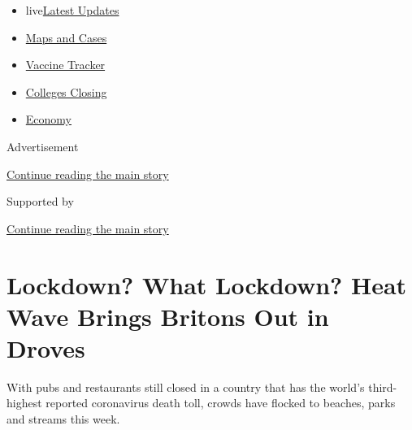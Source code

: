 \begin{itemize}
\tightlist
\item
  live\href{https://www.nytimes3xbfgragh.onion/2020/08/21/world/covid-19-coronavirus.html?name=styln-coronavirus-national\&region=TOP_BANNER\&variant=undefined\&block=storyline_menu_recirc\&action=click\&pgtype=Article\&impression_id=3f557141-e3a3-11ea-8263-afcaec2efa11}{Latest
  Updates}
\item
  \href{https://www.nytimes3xbfgragh.onion/interactive/2020/us/coronavirus-us-cases.html?name=styln-coronavirus-national\&region=TOP_BANNER\&variant=undefined\&block=storyline_menu_recirc\&action=click\&pgtype=Article\&impression_id=3f557142-e3a3-11ea-8263-afcaec2efa11}{Maps
  and Cases}
\item
  \href{https://www.nytimes3xbfgragh.onion/interactive/2020/science/coronavirus-vaccine-tracker.html?name=styln-coronavirus-national\&region=TOP_BANNER\&variant=undefined\&block=storyline_menu_recirc\&action=click\&pgtype=Article\&impression_id=3f559850-e3a3-11ea-8263-afcaec2efa11}{Vaccine
  Tracker}
\item
  \href{https://www.nytimes3xbfgragh.onion/2020/08/19/us/colleges-closing-covid.html?name=styln-coronavirus-national\&region=TOP_BANNER\&variant=undefined\&block=storyline_menu_recirc\&action=click\&pgtype=Article\&impression_id=3f559851-e3a3-11ea-8263-afcaec2efa11}{Colleges
  Closing}
\item
  \href{https://www.nytimes3xbfgragh.onion/live/2020/08/20/business/stock-market-today-coronavirus?name=styln-coronavirus-national\&region=TOP_BANNER\&variant=undefined\&block=storyline_menu_recirc\&action=click\&pgtype=Article\&impression_id=3f559852-e3a3-11ea-8263-afcaec2efa11}{Economy}
\end{itemize}

Advertisement

\protect\hyperlink{after-top}{Continue reading the main story}

Supported by

\protect\hyperlink{after-sponsor}{Continue reading the main story}

\hypertarget{lockdown-what-lockdown-heat-wave-brings-britons-out-in-droves}{%
\section{Lockdown? What Lockdown? Heat Wave Brings Britons Out in
Droves}\label{lockdown-what-lockdown-heat-wave-brings-britons-out-in-droves}}

With pubs and restaurants still closed in a country that has the world's
third-highest reported coronavirus death toll, crowds have flocked to
beaches, parks and streams this week.

